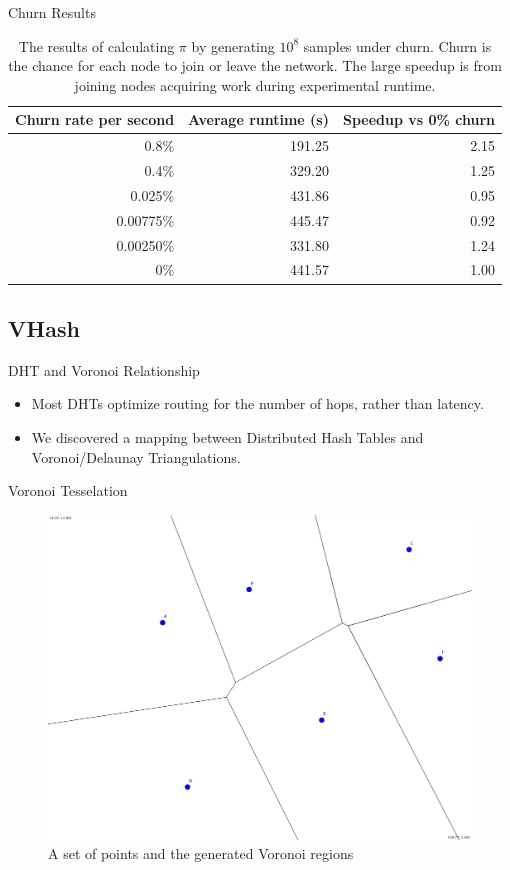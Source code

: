 \documentclass[11pt]{beamer}
\begin{document}
\begin{frame}{Churn Results}
	\begin{table}
		\centering
		\begin{tabular}{|r|r|r|} 
			\hline 
			Churn rate per second & Average runtime (s) & Speedup vs 0\% churn\\ \hline{}
			0.8\% & 191.25 & 2.15 \\ \hline
			0.4\% & 329.20 & 1.25 \\ \hline
			0.025\% & 431.86 & 0.95 \\ \hline 
			0.00775\%  & 445.47 & 0.92 \\ \hline 
			0.00250\% & 331.80  &  1.24 \\ \hline 
			0\% & 441.57 & 1.00 \\ \hline
		\end{tabular}
		\caption{The results of calculating $\pi$ by generating $10^8$ samples under churn. Churn is the chance for each node to join or leave the network. The large speedup is from joining nodes acquiring work during experimental runtime.} 
		\label{tab:churnSpeed}
	\end{table}
	
\end{frame}


\subsection{VHash}


\begin{frame}{DHT and Voronoi Relationship}
	\begin{itemize}
	
		\item Most DHTs optimize routing for the number of hops, rather than latency.
		\item We discovered a mapping between Distributed Hash Tables and Voronoi/Delaunay Triangulations.
	\end{itemize}
\end{frame}

\begin{frame}{Voronoi Tesselation}
	\begin{figure}
		\centering
		\includegraphics[width=0.5\linewidth]{figs/new_voronoi}
		\caption{A set of points and the generated Voronoi regions}
		\label{fig:new_voronoi}
	\end{figure}
\end{frame}
\end{document}
